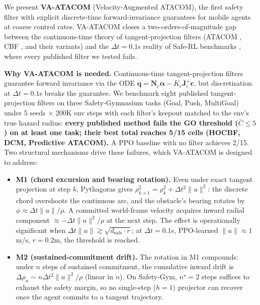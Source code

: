 \documentclass[letterpaper]{article}
\begin{document}
We present \textbf{VA-ATACOM} (Velocity-Augmented ATACOM), the first safety filter with explicit discrete-time forward-invariance guarantees for mobile agents at coarse control rates. VA-ATACOM closes a two-orders-of-magnitude gap between the continuous-time theory of tangent-projection filters (ATACOM \cite{liu2022,liu2024}, CBF \cite{ames2014,ames2017}, and their variants) and the $\Delta t = 0.1$s reality of Safe-RL benchmarks \cite{ji2023}, where every published filter we tested fails.

\textbf{Why VA-ATACOM is needed.} Continuous-time tangent-projection filters guarantee forward invariance via the ODE $\dot{\boldsymbol{q}} = \boldsymbol{N}_c\boldsymbol{\alpha} - K_c\boldsymbol{J}_c^{+}\boldsymbol{c}$, but discretisation at $\Delta t = 0.1$s breaks the guarantee. We benchmark eight published tangent-projection filters on three Safety-Gymnasium tasks (Goal, Push, MultiGoal) under 5 seeds $\times$ 200K env steps with each filter's keepout matched to the env's true hazard radius: \textbf{every published method fails the GO threshold ($\bar{C} \le 5$) on at least one task; their best total reaches 5/15 cells (HOCBF, DCM, Predictive ATACOM).} A PPO baseline with no filter achieves 2/15. Two structural mechanisms drive these failures, which VA-ATACOM is designed to address:

\begin{itemize}
\item \textbf{M1 (chord excursion and bearing rotation).} Even under exact tangent projection at step $k$, Pythagoras gives $\rho_{k+1}^2 = \rho_k^2 + \Delta t^2 \|u\|^2$: the discrete chord overshoots the continuous arc, and the obstacle's bearing rotates by $\phi \approx \Delta t\|u\|/\rho$. A committed world-frame velocity acquires inward radial component $\approx -\Delta t\|u\|^2/\rho$ at the next step. The effect is operationally significant when $\Delta t \|u\| \gtrsim \sqrt{d_\text{safe} \cdot r}$; at $\Delta t = 0.1$s, PPO-learned $\|u\| \approx 1$m/s, $r = 0.2$m, the threshold is reached.

\item \textbf{M2 (sustained-commitment drift).} The rotation in M1 compounds: under $n$ steps of sustained commitment, the cumulative inward drift is $\Delta\rho_n \sim n\Delta t^2 \|u\|^2/\rho$ (linear in $n$). On Safety-Gym, $n^\star = 2$ steps suffices to exhaust the safety margin, so no single-step ($h{=}1$) projector can recover once the agent commits to a tangent trajectory.
\end{itemize}
\end{document}
